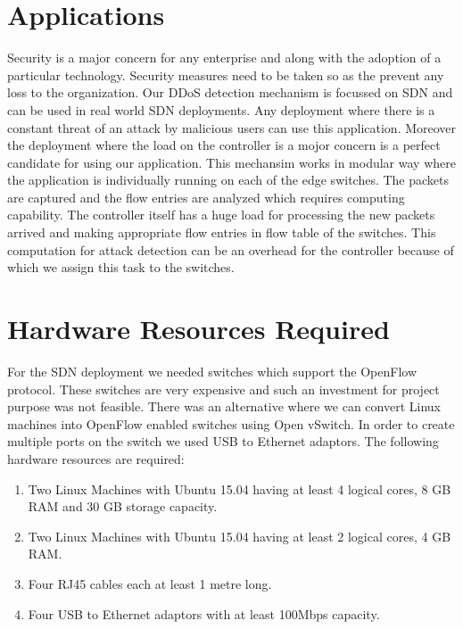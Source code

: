 \documentclass[12pt,a4paper,final]{report}
\begin{document}
\section{Applications}
Security is a major concern for any enterprise and along with the adoption of a particular technology. Security measures need to be taken so as the prevent any loss to the organization. Our DDoS detection mechanism is focussed on SDN and can be used in real world SDN deployments. Any deployment where there is a constant threat of an attack by malicious users can use this application. Moreover the deployment where the load on the controller is a mojor concern is a perfect candidate for using our application. This mechansim works in modular way where the application is individually running on each of the edge switches. The packets are captured and the flow entries are analyzed which requires computing capability. The controller itself has a huge load for processing the new packets arrived and making appropriate flow entries in flow table of the switches. This computation for attack detection can be an overhead for the controller because of which we assign this task to the switches.

\section{Hardware Resources Required}
For the SDN deployment we needed switches which support the OpenFlow protocol. These switches are very expensive and such an investment for project purpose was not feasible. There was an alternative where we can convert Linux machines into OpenFlow enabled switches using Open vSwitch. In order to create multiple ports on the switch we used USB to Ethernet adaptors. The following hardware resources are required:

\begin{enumerate}
\item
Two Linux Machines with Ubuntu 15.04 having at least 4 logical cores, 8 GB RAM and 30 GB storage capacity.

\item
Two Linux Machines with Ubuntu 15.04 having at least 2 logical cores, 4 GB RAM.

\item
Four RJ45 cables each at least 1 metre long.

\item
Four USB to Ethernet adaptors with at least 100Mbps capacity. 
\end{enumerate}
\end{document}
